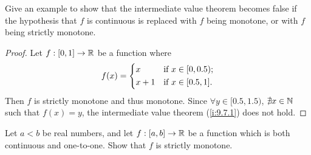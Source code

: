 \begin{ex}\label{i:ex:9.8.2}
  Give an example to show that the intermediate value theorem becomes false if the hypothesis that \(f\) is continuous is replaced with \(f\) being monotone, or with \(f\) being strictly monotone.
\end{ex}

\begin{proof}
  Let \(f : [0, 1] \to \mathbb{R}\) be a function where
  \[
    f(x) = \begin{dcases}
      x     & \text{if } x \in [0, 0.5); \\
      x + 1 & \text{if } x \in [0.5, 1].
    \end{dcases}
  \]
  Then \(f\) is strictly monotone and thus monotone.
  Since \(\forall y \in [0.5, 1.5)\), \(\nexists x \in \mathbb{N}\) such that \(f(x) = y\), the intermediate value theorem (\cref{i:9.7.1}) does not hold.
\end{proof}

\begin{ex}\label{i:ex:9.8.3}
  Let \(a < b\) be real numbers, and let \(f : [a, b] \to \mathbb{R}\) be a function which is both continuous and one-to-one.
  Show that \(f\) is strictly monotone.
\end{ex}

